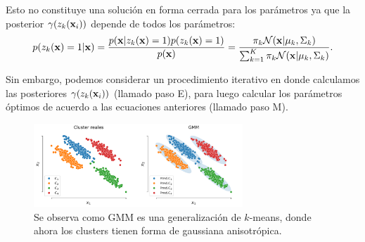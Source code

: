 \documentclass[handout, 9pt]{beamer}
\begin{document}
\begin{frame}
Esto no constituye una solución en forma cerrada para los parámetros ya que la posterior $\gamma(z_k(\mathbf{x}_i))$ depende de todos los parámetros:
\begin{align*}
	p(z_k(\mathbf{x})=1|\mathbf{x}) = \frac{p(\mathbf{x}|z_k(\mathbf{x})=1)p(z_k(\mathbf{x})=1)}{p(\mathbf{x})} = \frac{\pi_k {\mathcal N}(\mathbf{x}|\mu_k,\Sigma_k)}{\sum_{k=1}^K \pi_k {\mathcal N}(\mathbf{x}|\mu_k,\Sigma_k)} .
\end{align*} 
\pause

Sin embargo, podemos considerar un procedimiento iterativo en donde calculamos las posteriores $\gamma(z_k(\mathbf{x}_i))$ (llamado paso E), para luego calcular los parámetros óptimos de acuerdo a las ecuaciones anteriores (llamado paso M). \pause

\begin{figure}[ht]
  \centering
  \includegraphics[width=0.7\textwidth]{../../img/cap6_gmm}
  \caption{Se observa como GMM es una generalización de $k$-means, donde ahora los clusters tienen forma de gaussiana anisotrópica.}
  \label{fig:gmm}
\end{figure}

\end{frame}
\end{document}
